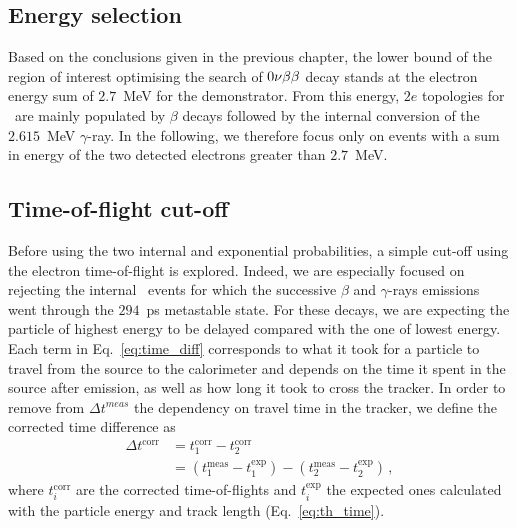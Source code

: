 \subsection{Energy selection}
\label{subsec:energy_seletion}

Based on the conclusions given in the previous chapter, the lower bound of the region of interest optimising the search of $0\nu\beta\beta$ decay stands at the electron energy sum of $2.7$~MeV for the demonstrator.
From this energy, $2e$ topologies for \Tl\ are mainly populated by $\beta$ decays followed by the internal conversion of the $2.615$~MeV $\gamma$-ray.
In the following, we therefore focus only on events with a sum in energy of the two detected electrons greater than $2.7$~MeV.

\subsection{Time-of-flight cut-off}
\label{subsec:tof_cutoff}

Before using the two internal and exponential probabilities, a simple cut-off using the electron time-of-flight is explored.
Indeed, we are especially focused on rejecting the internal \Tl\ events for which the successive $\beta$ and $\gamma$-rays emissions went through the $294$~ps metastable state.
For these decays, we are expecting the particle of highest energy to be delayed compared with the one of lowest energy.
Each term in Eq.~\ref{eq:time_diff} corresponds to what it took for a particle to travel from the source to the calorimeter and depends on the time it spent in the source after emission, as well as how long it took to cross the tracker.
In order to remove from $\Delta t^{meas}$ the dependency on travel time in the tracker, we define the corrected time difference as
\begin{align}
  \Delta t^{\text{corr}} & = t^{\text{corr}}_{1} - t^{\text{corr}}_{2}\\
  & = (t^{\text{meas}}_{1} - t^{\text{exp}}_{1}) - (t^{\text{meas}}_{2} - t^{\text{exp}}_{2})\,,
\end{align}
where $t^{\text{corr}}_{i}$ are the corrected time-of-flights and $t^{\text{exp}}_{i}$ the expected ones calculated with the particle energy and track length (Eq.~\ref{eq:th_time}).

